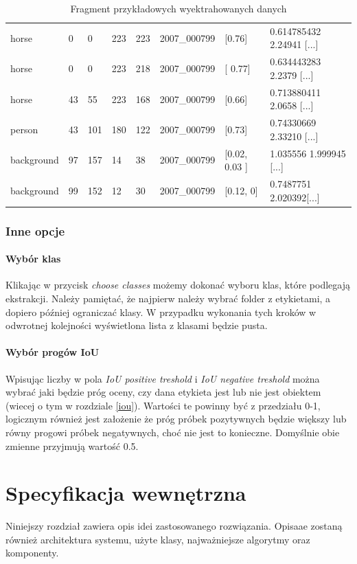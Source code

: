 \documentclass[a4paper,twoside,12pt]{book}
\begin{document}
{\begin{table}[h!]
\centering
\caption{Fragment przykładowych wyektrahowanych danych}
\begin{tabular}{|l|l|l|l|l|l|l|l|}
horse  & 0 & 0 & 223 & 223 & 2007\_000799 & [0.76] & 0.614785432 2.24941 [...]\\
horse  &0 & 0 & 223 & 218 & 2007\_000799 & [ 0.77]  &0.634443283 2.2379 [...]\\
horse &  43 & 55 & 223 & 168 & 2007\_000799 &[0.66] & 0.713880411 2.0658 [...]\\
person &  43 & 101 & 180 & 122 & 2007\_000799 & [0.73] & 0.74330669 2.33210 [...] \\
background & 97 & 157 & 14 & 38 & 2007\_000799 & [0.02, 0.03 ]& 1.035556 1.999945 [...]\\
background & 99 & 152 & 12 & 30 & 2007\_000799 &[0.12, 0] & 0.7487751 2.020392[...]\\
\end{tabular}
\label{cechy}
\end{table}

\subsection{Inne opcje}
\subsubsection{Wybór klas}
{Klikając w przycisk \emph{choose classes} możemy dokonać wyboru klas, które podlegają ekstrakcji. Należy pamiętać, że najpierw należy wybrać folder z etykietami, a dopiero później ograniczać klasy. W przypadku wykonania tych kroków w odwrotnej kolejności wyświetlona lista z klasami będzie pusta.}
\subsubsection{Wybór progów IoU}
{Wpisując liczby w pola \emph{IoU positive treshold} i \emph{IoU negative treshold} można wybrać jaki będzie próg oceny, czy dana etykieta jest lub nie jest obiektem (wiecej o tym w rozdziale \ref{iou}). Wartości te powinny być z przedziału 0-1, logicznym również jest założenie że próg próbek pozytywnych będzie większy lub równy progowi próbek negatywnych, choć nie jest to konieczne. Domyślnie obie zmienne przyjmują wartość 0.5.}


 

\chapter{Specyfikacja wewnętrzna}
{Niniejszy rozdział zawiera opis idei zastosowanego rozwiązania. Opisaae zostaną również architektura systemu, użyte klasy, najważniejsze algorytmy oraz komponenty.}
}
\end{document}
